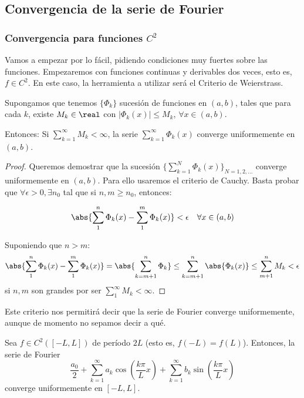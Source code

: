 	\subsection{Convergencia de la serie de Fourier}

		\subsubsection{Convergencia para funciones $C^2$}

		Vamos a empezar por lo fácil, pidiendo condiciones muy fuertes sobre las funciones. Empezaremos con funciones continuas y derivables dos veces, esto es, $f ∈ C^2$. En este caso, la herramienta a utilizar será el Criterio de Weierstrass.

		\begin{prop}\label{prop:criterio_Weierstrass} Supongamos que tenemos $\{\Phi_k\}$ sucesión de funciones en $(a,b)$, tales que para cada $k$, existe $M_k \in \real$ con $|\Phi_k(x)| \leq M_k$, $\forall x \in (a,b)$.

		Entonces: Si $\sum\limits_{k=1}^{\infty} M_k < \infty$, la serie $\sum\limits_{k=1}^{\infty} \Phi_k(x) $ converge uniformemente en $(a,b)$.
		\end{prop}

		\begin{proof}
			Queremos demostrar que la sucesión $\{\sum\limits_{k=1}^{N} \Phi_k(x)\}_{N=1,2,…} $ converge uniformemente en $(a,b)$. Para ello usaremos el criterio de Cauchy. Basta probar que $\forall \epsilon > 0, \exists n_0 $ tal que si $n,m \geq n_0 $, entonces:

			\[ \abs{\sum^n_1 \Phi_k(x) - \sum^m_1 \Phi_k(x)} < \epsilon \quad \forall x \in (a,b) \]

			Suponiendo que $n > m$:
			\[ \abs{\sum^{n}_1 \Phi_k (x) - \sum^{m}_1 \Phi_k (x)} = \abs{\sum^n_{k=m+1} \Phi_k} \leq \sum^n_{k=m+1} \abs{\Phi_k (x)} \leq \sum_{m+1}^n M_k < \epsilon\]
			si $n,m$ son grandes por ser  $\sum\limits_{1}^{\infty} M_k < \infty $.
		\end{proof}

		Este criterio nos permitirá decir que la serie de Fourier converge uniformemente, aunque de momento no sepamos decir a qué.

		\begin{prop} \label{prop:ConvergenciaUniformeFourier} Sea $f \in C^2 ([-L, L])$ de período $2L$ (esto es, $f(-L) = f(L)$). Entonces, la serie de Fourier \[ \frac{a_0}{2} + \sum_{k=1}^\infty a_k \cos \left( \frac{k \pi}{L} x \right) + \sum_{k=1}^\infty b_k \sin \left( \frac{k \pi}{L} x \right) \] converge uniformemente en $[-L, L]$.
		\end{prop}

